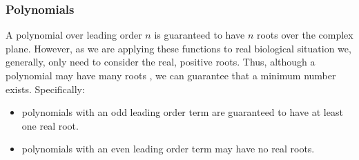\subsubsection{Polynomials}
A polynomial over leading order $n$ is guaranteed to have $n$ roots over the complex plane. However, as we are applying these functions to real biological situation we, generally, only need to consider the real, positive roots. Thus, although a polynomial may have many roots , we can guarantee that a minimum number exists. Specifically:
\begin{itemize}
\item polynomials with an odd leading order term are guaranteed to have at least one real root.
\item polynomials with an even leading order term may have no real roots.
\end{itemize}

